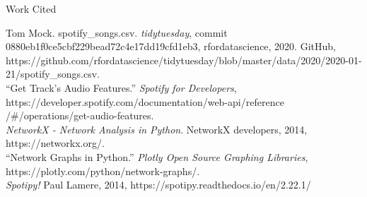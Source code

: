 \documentclass[fontsize=11pt]{article}
\begin{document}
\newpage
\begin{center}
    Work Cited 
\end{center}

\begin{hangparas}{0.25in}{1}
Tom Mock. spotify\_songs.csv. \textit{tidytuesday}, commit 0880eb1f0ce5cbf229bead72c4e17dd19cfd1eb3, rfordatascience, 2020. GitHub, https://github.com/rfordatascience/tidytuesday/blob/master/data/2020/2020-01-21/spotify\_songs.csv.
\\


“Get Track's Audio Features.” \textit{Spotify for Developers}, https://developer.spotify.com/documentation/web-api/reference
/\#/operations/get-audio-features.
 \\


\textit{NetworkX - Network Analysis in Python}. NetworkX developers, 2014, https://networkx.org/.
\\

“Network Graphs in Python.” \textit{Plotly Open Source Graphing Libraries}, https://plotly.com/python/network-graphs/.
\\


\textit{Spotipy!} Paul Lamere, 2014, https://spotipy.readthedocs.io/en/2.22.1/


\end{hangparas}



\end{document}
